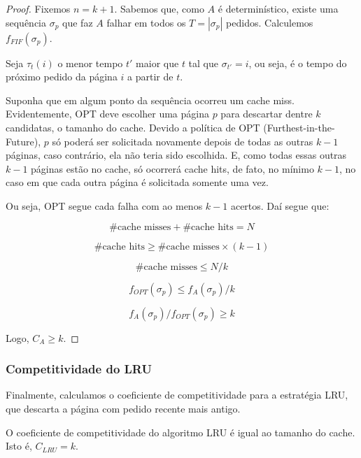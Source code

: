 \documentclass[a4paper,oneside,reqno,12pt]{amsart}
\begin{document}
\begin{proof}

Fixemos $n = k + 1$. Sabemos que, como $A$ é determinístico, existe uma sequência $\sigma_p$ que faz $A$ falhar em todos os $T = |\sigma_p|$ pedidos. Calculemos $f_{FIF}(\sigma_p)$. 

Seja $\tau_t(i)$ o menor tempo $t'$ maior que $t$ tal que $\sigma_{t'} = i$, ou seja, é o tempo do próximo pedido da página $i$ a partir de $t$.



Suponha que em algum ponto da sequência ocorreu um cache miss. Evidentemente, OPT deve escolher uma página $p$ para descartar dentre $k$ candidatas, o tamanho do cache. Devido a política de OPT (Furthest-in-the-Future), $p$ só poderá ser solicitada novamente depois de todas as outras $k - 1$ páginas, caso contrário, ela não teria sido escolhida. E, como todas essas outras $k - 1$ páginas estão no cache, só ocorrerá cache hits, de fato, no mínimo $k - 1$, no caso em que cada outra página é solicitada somente uma vez.

Ou seja, OPT segue cada falha com ao menos $k-1$ acertos. Daí segue que:

\[\text{\# cache misses} + \text{\# cache hits} = N\]

\[ \text{\# cache hits} \geqslant \text{\# cache misses} \times (k-1)\]

\[\text{\# cache misses} \leqslant N/k\]

\[f_{OPT}(\sigma_p) \leqslant f_A(\sigma_p) / k\]

\[f_A(\sigma_p)/f_{OPT}(\sigma_p) \geqslant k\]

Logo, $C_A \geqslant k$.
\end{proof}


\subsubsection{Competitividade do LRU}

Finalmente, calculamos o coeficiente de competitividade para a estratégia LRU, que descarta a página com pedido recente mais antigo.

\begin{theorem}
O coeficiente de competitividade do algoritmo LRU é igual ao tamanho do cache. Isto é, $C_{LRU} = k$.
\end{theorem}
\end{document}
